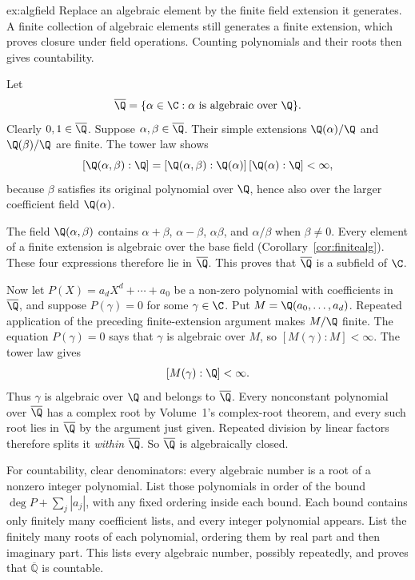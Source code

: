 \begin{solution}{ex:algfield}
\idea Replace an algebraic element by the finite field extension it generates. A finite collection of algebraic elements still generates a finite extension, which proves closure under field operations. Counting polynomials and their roots then gives countability.

\writeup Let
\[
\overline{\Q}=\{\alpha\in\C:\alpha\text{ is algebraic over }\Q\}.
\]
Clearly $0,1\in\overline{\Q}$. Suppose $\alpha,\beta\in\overline{\Q}$. Their simple extensions $\Q(\alpha)/\Q$ and $\Q(\beta)/\Q$ are finite. The tower law shows
\[
[\Q(\alpha,\beta):\Q]
=[\Q(\alpha,\beta):\Q(\alpha)]\,[\Q(\alpha):\Q]
<\infty,
\]
because $\beta$ satisfies its original polynomial over $\Q$, hence also over the larger coefficient field $\Q(\alpha)$.

The field $\Q(\alpha,\beta)$ contains $\alpha+\beta$, $\alpha-\beta$, $\alpha\beta$, and $\alpha/\beta$ when $\beta\ne0$. Every element of a finite extension is algebraic over the base field (Corollary~\ref{cor:finitealg}). These four expressions therefore lie in $\overline{\Q}$. This proves that $\overline{\Q}$ is a subfield of $\C$.

Now let $P(X)=a_dX^d+\cdots+a_0$ be a non-zero polynomial with coefficients in $\overline{\Q}$, and suppose $P(\gamma)=0$ for some $\gamma\in\C$. Put $M=\Q(a_0,\ldots,a_d)$. Repeated application of the preceding finite-extension argument makes $M/\Q$ finite. The equation $P(\gamma)=0$ says that $\gamma$ is algebraic over $M$, so $[M(\gamma):M]<\infty$. The tower law gives
\[
[M(\gamma):\Q]<\infty.
\]
Thus $\gamma$ is algebraic over $\Q$ and belongs to $\overline{\Q}$.
Every nonconstant polynomial over $\overline{\Q}$ has a complex root
by Volume~1's complex-root theorem, and every such root lies in
$\overline{\Q}$ by the argument just given. Repeated division by
linear factors therefore splits it \emph{within} $\overline{\Q}$.
So $\overline{\Q}$ is algebraically closed.

For countability, clear denominators: every algebraic number is a root
of a nonzero integer polynomial. List those polynomials in order of the bound
$\deg P+\sum_j|a_j|$, with any fixed ordering inside each bound. Each bound
contains only finitely many coefficient lists, and every integer polynomial
appears. List the finitely many roots of each polynomial, ordering them by
real part and then imaginary part. This lists every algebraic number,
possibly repeatedly, and proves that $\overline{\mathbb Q}$ is countable.


\end{solution}
